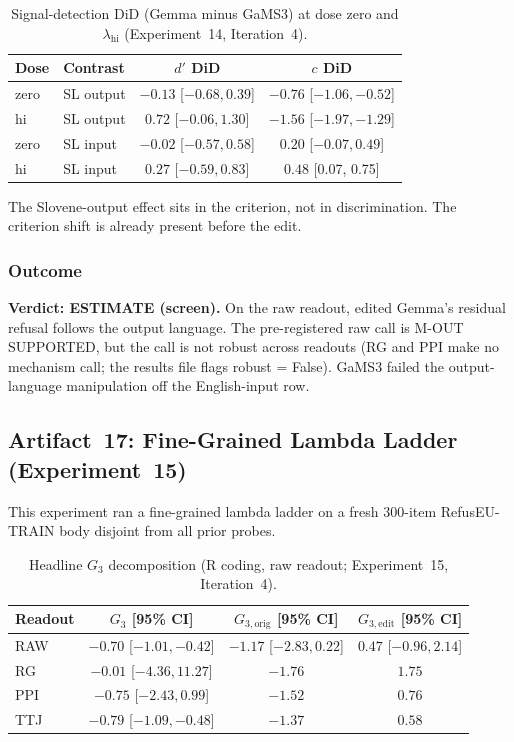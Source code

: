 \documentclass[11pt,letterpaper]{article}
\begin{document}
\begin{table}[!htbp]
\centering
\caption{Signal-detection DiD (Gemma minus GaMS3) at dose zero and $\lambda_{\text{hi}}$ (Experiment~14, Iteration~4).}
\label{tab:sdt_exp14}
\begin{tabular}{llcc}
\toprule
Dose & Contrast & $d'$ DiD & $c$ DiD \\
\midrule
zero & SL output & $-0.13$ [$-0.68, 0.39$] & $-0.76$ [$-1.06, -0.52$] \\
hi & SL output & $0.72$ [$-0.06, 1.30$] & $-1.56$ [$-1.97, -1.29$] \\
zero & SL input & $-0.02$ [$-0.57, 0.58$] & $0.20$ [$-0.07, 0.49$] \\
hi & SL input & $0.27$ [$-0.59, 0.83$] & $0.48$ [0.07, 0.75] \\
\bottomrule
\end{tabular}
\end{table}

The Slovene-output effect sits in the criterion, not in discrimination. The criterion shift is already present before the edit.

\subsubsection{Outcome}

\textbf{Verdict: ESTIMATE (screen).} On the raw readout, edited Gemma's residual refusal follows the output language. The pre-registered raw call is M-OUT SUPPORTED, but the call is not robust across readouts (RG and PPI make no mechanism call; the results file flags robust = False). GaMS3 failed the output-language manipulation off the English-input row.


\subsection{Artifact~17: Fine-Grained Lambda Ladder (Experiment~15)}
\label{gen_art_experiment_15}

This experiment ran a fine-grained lambda ladder on a fresh 300-item RefusEU-TRAIN body disjoint from all prior probes.

\begin{table}[!htbp]
\centering
\caption{Headline $G_3$ decomposition (R coding, raw readout; Experiment~15, Iteration~4).}
\label{tab:g3_exp15}
\begin{tabular}{lccc}
\toprule
Readout & $G_3$ [95\% CI] & $G_{3,\text{orig}}$ [95\% CI] & $G_{3,\text{edit}}$ [95\% CI] \\
\midrule
RAW & $-0.70$ [$-1.01, -0.42$] & $-1.17$ [$-2.83, 0.22$] & $0.47$ [$-0.96, 2.14$] \\
RG & $-0.01$ [$-4.36, 11.27$] & $-1.76$ & $1.75$ \\
PPI & $-0.75$ [$-2.43, 0.99$] & $-1.52$ & $0.76$ \\
TTJ & $-0.79$ [$-1.09, -0.48$] & $-1.37$ & $0.58$ \\
\bottomrule
\end{tabular}
\end{table}
\end{document}

